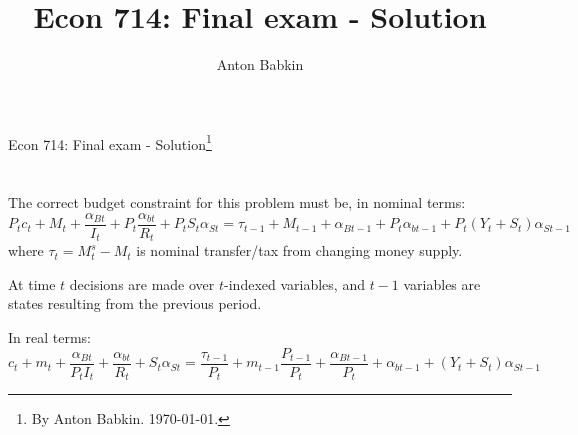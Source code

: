 \documentclass{article}
\title{Econ 714: Final exam - Solution}
\author{Anton Babkin}
\begin{document}
{\Large Econ 714: Final exam - Solution\footnote{By Anton Babkin. \today.}}

\section[]{}
The correct budget constraint for this problem must be, in nominal terms:
\begin{equation*}
  P_tc_t+M_t+\frac{\alpha_{Bt}}{I_t}+P_t\frac{\alpha_{bt}}{R_t}+P_tS_t\alpha_{St}=\tau_{t-1}+M_{t-1}+\alpha_{Bt-1}+P_t\alpha_{bt-1}+P_t(Y_t+S_t)\alpha_{St-1}
\end{equation*}
where $\tau_t = M_t^s-M_t$ is nominal transfer/tax from changing money supply.

At time $t$ decisions are made over $t$-indexed variables, and $t-1$
variables are states resulting from the previous period.

In real terms:
\begin{equation*}
  c_t+m_t+\frac{\alpha_{Bt}}{P_tI_t}+\frac{\alpha_{bt}}{R_t}+S_t\alpha_{St}=\frac{\tau_{t-1}}{P_t}+m_{t-1}\frac{P_{t-1}}{P_t}+\frac{\alpha_{Bt-1}}{P_t}+\alpha_{bt-1}+(Y_t+S_t)\alpha_{St-1}
\end{equation*}
\end{document}
